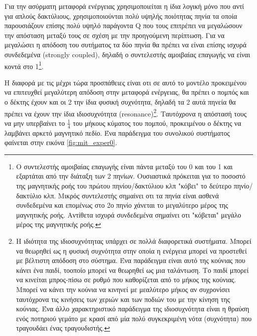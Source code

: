 Για την ασύρματη μεταφορά ενέργειας χρησιμοποιείται η ίδια λογική μόνο που αντί για απλούς δακτύλιους, χρησιμοποιούνται πολύ υψηλής ποιότητας πηνία τα οποία
παρουσιάζουν επίσης πολύ υψηλό παράγοντα Q που τους επιτρέπει να μεγαλώσουν την απόσταση μεταξύ τους σε σχέση με την προηγούμενη περίπτωση. Για να μεγαλώσει η απόδοση
του συτήματος τα δύο πηνία θα πρέπει να είναι επίσης ισχυρά συνδεδεμένα (strongly coupled), δηλαδή ο συντελεστής αμοιβαίας επαγωγής να είναι κοντά στο 1\footnote{Ο
συντελεστής αμοιβαίας επαγωγής είναι πάντα μεταξύ του 0 και του 1 και εξαρτάται από την διάταξη των 2 πηνίων. Ουσιαστικά πρόκειται για το ποσοστό της μαγνητικής ροής
του πρώτου πηνίου/δακτύλιου κλπ "κόβει" το δεύτερο πηνίο/δακτύλιο κλπ. Μικρός συντελεστής σημαίνει οτι τα πηνία είναι ασθενά συνδεδεμένα και επομένως στο 2ο πηνίο
χάνεται το μεγαλύτερο μέρος της μαγνητικής ροής. Αντίθετα ισχυρά συνδεδεμένα σημαίνει οτι "κόβεται" μεγάλο μέρος της μαγνητικής ροής.}.

Η διαφορά με τις μέχρι τώρα προσπάθειες είναι οτι σε αυτό το μοντέλο προκειμένου να επιτευχθεί μεγαλύτερη απόδοση στην μεταφορά ενέργειας, θα πρέπει ο πομπός και ο
δέκτης έχουν και οι 2 την ίδια φυσική συχνότητα, δηλαδή τα 2 αυτά πηνεία θα πρέπει
να έχουν την ίδια ιδιοσυχνότητα (resonance)\footnote{Η ιδιότητα της ιδιοσυχνότητας υπάρχει σε πολλά διαφορετικά συστήματα. Μπορεί να θεωρηθεί  ως  η φυσική
συχνότητα στην οποία η ενέργεια μπορεί να προστεθεί με βέλτιστη απόδοση στο σύστημα. Ένα παράδειγμα είναι αυτό της κούνιας που κάνει ένα παιδί, τοοποίο μπορεί να
θεωρηθεί ως μια ταλάντωση. Το παιδί μπορεί να κινείται μπρος-πίσω σε ρυθμό που καθορίζεται από το μήκος της κούνιας. Μπορεί να κάνει την κούνια να κινηνεί με
μεαλύτερο μήκος αν συχρονίσει ταυτόχρονα τις κινήσεις των χεριών και των ποδιών του με την κίνηση της κούνιας. Ένα άλλο χαρακτηριστικό παράδειγμα της ιδιοσυχνότητα
είναι η θραύση ενός ποτηριού γεμάτο με κρασί από μία πολύ συγκεκριμένη νότα (συχνότητα) που τραγουδάει ένας τραγουδιστής.}. Ταυτόχρονα η απόστασή τους να μην
υπερβαίνει το $\frac{1}{4}$ του μήκους κύματος του πομπού, προκειμένου ο δέκτης να λαμβάνει αρκετό μαγνητικό πεδίο. Ένα παράδειγμα του συνολικού συστήματος φαίνεται
στην εικόνα \ref{fig:mit_exper0}.    



